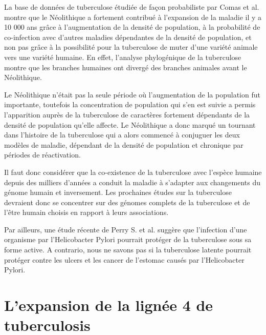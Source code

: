 \documentclass[twoside,a4paper,11pt,frenchb,openany]{report}
\begin{document}
La base de données de tuberculose étudiée de façon probabiliste par Comas et al. montre que le Néolithique a fortement contribué à l'expansion de la maladie il y a 10 000 ans grâce à l'augmentation de la densité de population, à la probabilité de co-infection avec d'autres maladies dépendantes de la densité de population, et non pas grâce à la possibilité pour la tuberculose de muter d'une variété animale vers une variété humaine. En effet, l'analyse phylogénique de la tuberculose montre que les branches humaines ont divergé des branches animales avant le Néolithique.

Le Néolithique n'était pas la seule période où l'augmentation de la population fut importante, toutefois la concentration de population qui s'en est suivie a permis l'apparition auprès de la tuberculose de caractères fortement dépendants de la densité de population qu'elle affecte. Le Néolithique a donc marqué un tournant dans l'histoire de la tuberculose qui a alors commencé à conjuguer les deux modèles de maladie, dépendant de la densité de population et chronique par périodes de réactivation.



Il faut donc considérer que la co-existence de la tuberculose avec l'espèce humaine depuis des milliers d'années a conduit la maladie à s'adapter aux changements du génome humain et inversement. Les prochaines études sur la tuberculose devraient donc se concentrer sur des génomes complets de la tuberculose et de l'être humain choisis en rapport à leurs associations.

Par ailleurs, une étude récente de Perry S. et al.\cite{perry1, perry2} suggère que l'infection d'une organisme par l'Helicobacter Pylori pourrait protéger de la tuberculose sous sa forme active. A contrario, nous ne savons pas si la tuberculose latente pourrait protéger contre les ulcers et les cancer de l'estomac causés par l'Helicobacter Pylori.




\section{L'expansion de la lignée 4 de tuberculosis}
\end{document}

